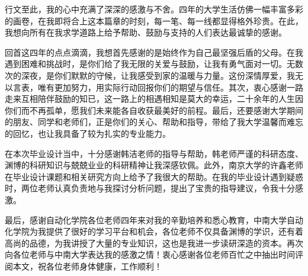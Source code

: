 \begin{acknowledgements} 

行文至此，我的心中充满了深深的感激与不舍。四年的大学生活仿佛一幅丰富多彩的画卷，在我即将合上这本篇章的时刻，每一笔、每一线都显得格外珍贵。在此，我想向所有在我求学道路上给予帮助、鼓励与支持的人们表达最诚挚的感谢。

回首这四年的点点滴滴，我想首先感谢的是始终作为自己最坚强后盾的父母。在我遇到困难和挑战时，是你们给了我无限的关爱与鼓励，让我有勇气面对一切。无数次的深夜，是你们默默的守候，让我感受到家的温暖与力量。这份深情厚爱，我无以言表，唯有更加努力，用实际行动回报你们的期望与信任。其次，衷心感谢一路走来互相陪伴鼓励的知已，这一路上的相遇相知是莫大的幸运，二十余年的人生因你们而不再孤单，愿我们未来能各自收获最美好的前程。最后，还要感谢大学期间的朋友、同学和老师们，正是你们的关心、帮助和指导，带给了我大学温馨而难忘的回忆，也让我具备了较为扎实的专业能力。

在本次毕业设计当中，十分感谢韩洁老师的指导与帮助，韩老师严谨的科研态度、渊博的科研知识与兢兢业业的科研精神让我深感钦佩。此外，南京大学的许鑫老师在毕业设计课题和相关研究方向上给予了我很大的帮助。在我的毕业设计遇到疑惑时，两位老师认真负责地与我探讨分析问题，提出了宝贵的指导建议，令我十分感激。

最后，感谢自动化学院各位老师四年来对我的辛勤培养和悉心教育，中南大学自动化学院为我提供了很好的学习平台和机会，各位老师不仅具备渊博的学识，还有着高尚的品德，为我讲授了大量的专业知识，这也是我进一步读研深造的资本。再次向各位老师与中南大学表达我的感激之情！衷心感谢各位老师百忙之中抽出时间评阅本文，祝各位老师身体健康，工作顺利！

\end{acknowledgements}
